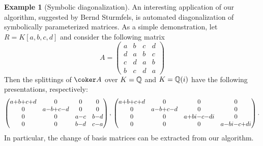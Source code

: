 \documentclass[12pt]{article}
\theoremstyle{theorem}
\numberwithin{thm}{section}
\theoremstyle{definition}
\newtheorem{exa}[thm]{Example}
\newcommand{\mahrud}[1]{{\color{ForestGreen} \sf $\blacklozenge$ Mahrud: [#1]}}
\begin{document}
\begin{exa}[Symbolic diagonalization]\label{ex:diagonalization}
  An interesting application of our algorithm, suggested by Bernd Sturmfels,  is automated diagonalization of symbolically parameterized matrices. As a simple demonstration, let $R = K[a,b,c,d]$ and consider the following matrix
  \[ A = \begin{pmatrix}
    a&b&c&d\\
    d&a&b&c\\
    c&d&a&b\\
    b&c&d&a
  \end{pmatrix} \]
  Then the splittings of $\coker A$ over $K = \mathbb Q$ and $K = \mathbb Q(i)$ have the following presentations, respectively:
  \[\medmuskip0mu \begin{pmatrix}
    a+b+c+d&0&0&0\\
    0&a-b+c-d&0&0\\
    0&0&a-c&b-d\\
    0&0&b-d&c-a
  \end{pmatrix},
  \,
  \begin{pmatrix}
    a+b+c+d&0&0&0\\
    0&a-b+c-d&0&0\\
    0&0&a+bi-c-di&0\\
    0&0&0&a-bi-c+di
  \end{pmatrix}.
  \]
  In particular, the change of basis matrices can be extracted from our algorithm.
\end{exa}





\end{document}
